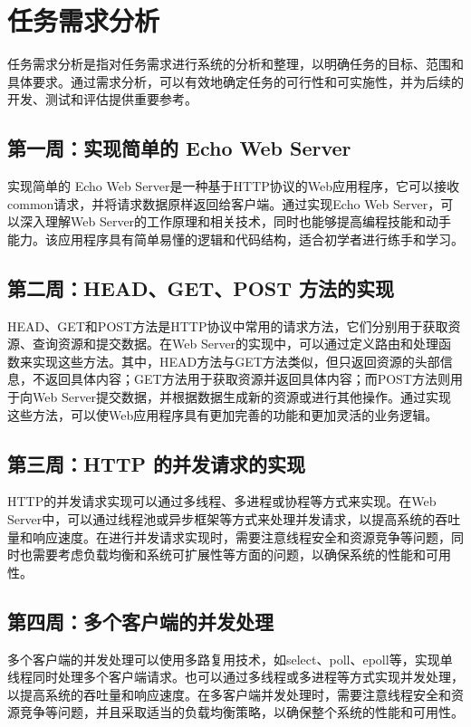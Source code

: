 \chapter{任务需求分析}
任务需求分析是指对任务需求进行系统的分析和整理，以明确任务的目标、范围和具体要求。通过需求分析，可以有效地确定任务的可行性和可实施性，并为后续的开发、测试和评估提供重要参考。

\section{第一周：实现简单的 Echo Web Server}
实现简单的 Echo Web Server是一种基于HTTP协议的Web应用程序，它可以接收common请求，并将请求数据原样返回给客户端。通过实现Echo Web Server，可以深入理解Web Server的工作原理和相关技术，同时也能够提高编程技能和动手能力。该应用程序具有简单易懂的逻辑和代码结构，适合初学者进行练手和学习。

\section{第二周：HEAD、GET、POST 方法的实现}
HEAD、GET和POST方法是HTTP协议中常用的请求方法，它们分别用于获取资源、查询资源和提交数据。在Web Server的实现中，可以通过定义路由和处理函数来实现这些方法。其中，HEAD方法与GET方法类似，但只返回资源的头部信息，不返回具体内容；GET方法用于获取资源并返回具体内容；而POST方法则用于向Web Server提交数据，并根据数据生成新的资源或进行其他操作。通过实现这些方法，可以使Web应用程序具有更加完善的功能和更加灵活的业务逻辑。

\section{第三周：HTTP 的并发请求的实现}
HTTP的并发请求实现可以通过多线程、多进程或协程等方式来实现。在Web Server中，可以通过线程池或异步框架等方式来处理并发请求，以提高系统的吞吐量和响应速度。在进行并发请求实现时，需要注意线程安全和资源竞争等问题，同时也需要考虑负载均衡和系统可扩展性等方面的问题，以确保系统的性能和可用性。

\section{第四周：多个客户端的并发处理}
多个客户端的并发处理可以使用多路复用技术，如select、poll、epoll等，实现单线程同时处理多个客户端请求。也可以通过多线程或多进程等方式实现并发处理，以提高系统的吞吐量和响应速度。在多客户端并发处理时，需要注意线程安全和资源竞争等问题，并且采取适当的负载均衡策略，以确保整个系统的性能和可用性。